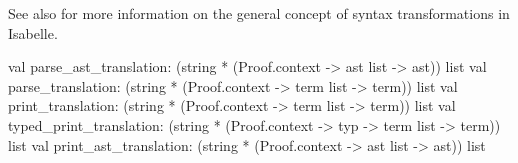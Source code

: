 \begin{isabellebody}
\begin{isamarkuptext}
  See also \cite{isabelle-ref} for more information on the general
  concept of syntax transformations in Isabelle.

\begin{ttbox}
val parse_ast_translation:
  (string * (Proof.context -> ast list -> ast)) list
val parse_translation:
  (string * (Proof.context -> term list -> term)) list
val print_translation:
  (string * (Proof.context -> term list -> term)) list
val typed_print_translation:
  (string * (Proof.context -> typ -> term list -> term)) list
val print_ast_translation:
  (string * (Proof.context -> ast list -> ast)) list
\end{ttbox}%
\end{isamarkuptext}%
\isamarkuptrue%
%
\isadelimtheory
%
\endisadelimtheory
%
\isatagtheory
{}\isamarkupfalse%
%
\endisatagtheory
{\isafoldtheory}%
%
\isadelimtheory
%
\endisadelimtheory
\isanewline
\end{isabellebody}%
